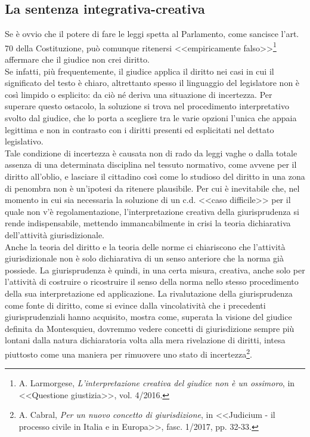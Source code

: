 \subsection{La sentenza integrativa-creativa}
Se è ovvio che il potere di fare le leggi spetta al Parlamento, come sancisce l'art. 70 della Costituzione, può comunque ritenersi <<empiricamente falso>>\footnote{A. Larmorgese, \textit{L’interpretazione creativa del giudice non è un ossimoro}, in <<Questione giustizia>>, vol. 4/2016.} affermare che il giudice non crei diritto.
\\Se infatti, più frequentemente, il giudice applica il diritto nei casi in cui il significato del testo è chiaro, altrettanto spesso il linguaggio del legislatore non è così limpido o esplicito: da ciò né deriva una situazione di incertezza.
Per superare questo ostacolo, la soluzione si trova nel procedimento interpretativo svolto dal giudice, che lo porta a scegliere tra le varie opzioni l’unica che appaia legittima e non in contrasto con i diritti presenti ed esplicitati nel dettato legislativo. 
\\Tale condizione di incertezza è causata non di rado da leggi vaghe o dalla totale assenza di una determinata disciplina nel tessuto normativo, come avvene per il diritto all’oblio, e lasciare il cittadino così come lo studioso del diritto in una zona di penombra non è un'ipotesi da ritenere plausibile.
Per cui è inevitabile che, nel momento in cui sia necessaria la soluzione di un c.d. <<caso difficile>> per il quale non v'è regolamentazione, l'interpretazione creativa della giurisprudenza si rende indispensabile, mettendo immancabilmente in crisi la teoria dichiarativa dell’attività giurisdizionale.
\\Anche la teoria del diritto e la teoria delle norme ci chiariscono che l’attività giurisdizionale non è solo dichiarativa di un senso anteriore che la norma già possiede. La giurisprudenza è quindi, in una certa misura, creativa, anche solo per l'attività di costruire o ricostruire il senso della norma nello stesso procedimento della sua interpretazione ed applicazione. La rivalutazione della giurisprudenza come fonte di diritto, come si evince dalla vincolatività che i precedenti giurisprudenziali hanno acquisito, mostra come, superata la visione del giudice definita da Montesquieu, dovremmo vedere concetti di giurisdizione sempre più lontani dalla natura dichiaratoria volta alla mera rivelazione di diritti, intesa piuttosto come una maniera per rimuovere uno stato di incertezza\footnote{A. Cabral, \textit{Per un nuovo concetto di giurisdizione}, in <<Judicium - il processo civile in Italia e in Europa>>, fasc. 1/2017, pp. 32-33.}.


